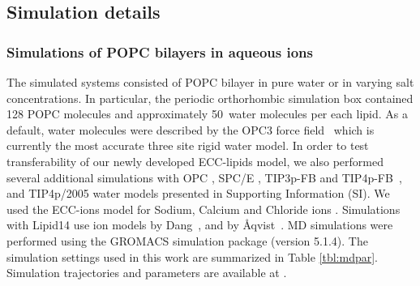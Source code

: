 \documentclass[aip,jcp,twocolumn]{revtex4}
\begin{document}
\subsection{Simulation details}

\subsubsection{Simulations of POPC bilayers in aqueous ions}
The simulated systems consisted of POPC bilayer in pure water
or in varying salt concentrations.
In particular, the periodic orthorhombic simulation box contained 
128 POPC molecules and approximately 50~water molecules per each lipid.
As a default, water molecules were described by the OPC3 force field~\cite{Izadi16} 
which is currently the most accurate three site rigid water model. 
In order to test transferability of our newly developed ECC-lipids model, 
we also performed several additional simulations with 
OPC \cite{Izadi14}, SPC/E \cite{Berendsen1987}, TIP3p-FB and TIP4p-FB~\cite{Wang2014}, and TIP4p/2005 \cite{Abascal2005} water models
presented in Supporting Information (SI). 
We used the ECC-ions model for Sodium, Calcium and Chloride ions \cite{jungwirth17-new-paper-to-be-published, kohagen16, Pluharova2014}.  %
Simulations with Lipid14 use ion models by Dang~\cite{smith94,chang1999,dang2006}, and by \AA{}qvist~\cite{aqvist90}. 
MD simulations were performed using the GROMACS \cite{Abraham15} simulation package (version 5.1.4).  
The simulation settings used in this work are 
summarized in Table \ref{tbl:mdpar}. 
Simulation trajectories and parameters are available at \cite{??} . 
\end{document}
